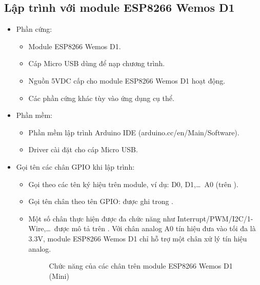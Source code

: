 \subsection{Lập trình với module ESP8266 Wemos D1}
    \begin{itemize}
        \item Phần cứng:
            \begin{itemize}
                \item Module ESP8266 Wemos D1.
                \item Cáp Micro USB dùng để nạp chương trình.
                \item Nguồn 5VDC cấp cho module ESP8266 Wemos D1 hoạt động.
                \item Các phần cứng khác tùy vào ứng dụng cụ thể.
            \end{itemize}

        \item Phần mềm:
            \begin{itemize}
                \item Phần mềm lập trình Arduino IDE (arduino.cc/en/Main/Software).
                \item Driver cài đặt cho cáp Micro USB.
            \end{itemize}

        \item Gọi tên các chân GPIO khi lập trình:
            \begin{itemize}
                \item Gọi theo các tên ký hiệu trên module, ví dụ: D0, D1,\ldots\, A0 (trên \fig{\ref{Fig:esp8266-wemos-d1}}).
                \item Gọi tên chân theo tên GPIO: được ghi trong \fig{\ref{Fig:chuc-nang-pin-esp8266-wemos-d1}}.
                \item Một số chân thực hiện được đa chức năng như Interrupt/PWM/I2C/1-Wire,\ldots\ được mô tả trên \fig{\ref{Fig:chuc-nang-pin-esp8266-wemos-d1}}. Với chân analog A0 tín hiệu đưa vào tối đa là 3.3V, module ESP8266 Wemos D1 chỉ hỗ trợ một chân xử lý tín hiệu analog.
                    \begin{figure}[!hp]
                        \begin{center}
                        \end{center}
                        \caption{Chức năng của các chân trên module ESP8266 Wemos D1 (Mini)} \label{Fig:chuc-nang-pin-esp8266-wemos-d1}
                    \end{figure}
            \end{itemize}
    \end{itemize}

